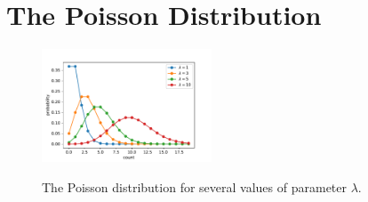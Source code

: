 \documentclass[12pt,oneside]{book}
\begin{document}
\section{The Poisson Distribution}
\label{sec:poisson}

\begin{figure}[htbp]
\begin{center}
{\includegraphics[width=0.45\textwidth]{figs/poisson.pdf}}
\end{center}
\caption{\label{fig:poisson}  The Poisson distribution for several values of parameter $\lambda$.}
\end{figure}
\end{document}
